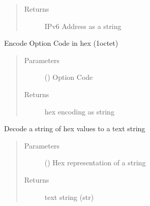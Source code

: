 \documentclass[letterpaper,10pt,english]{sphinxmanual}
\begin{document}
\begin{fulllineitems}
\begin{fulllineitems}
\begin{quote}
\begin{description}
\item[{Returns}] \leavevmode
\sphinxAtStartPar
IPv6 Address as a string

\end{description}\end{quote}

\end{fulllineitems}


\begin{fulllineitems}
\label{\detokenize{dhcp_decode-class:bloxone.dhcp_decode.hex_to_optcode}}
\sphinxAtStartPar
Encode Option Code in hex (1\sphinxhyphen{}octet)
\begin{quote}\begin{description}
\item[{Parameters}] \leavevmode
\sphinxAtStartPar
{} () \textendash{} Option Code

\item[{Returns}] \leavevmode
\sphinxAtStartPar
hex encoding as string

\end{description}\end{quote}

\end{fulllineitems}


\begin{fulllineitems}
\label{\detokenize{dhcp_decode-class:bloxone.dhcp_decode.hex_to_string}}
\sphinxAtStartPar
Decode a string of hex values to a text string
\begin{quote}\begin{description}
\item[{Parameters}] \leavevmode
\sphinxAtStartPar
{} () \textendash{} Hex representation of a string

\item[{Returns}] \leavevmode
\sphinxAtStartPar
text string (str)


\end{description}
\end{quote}
\end{fulllineitems}
\end{fulllineitems}
\end{document}

